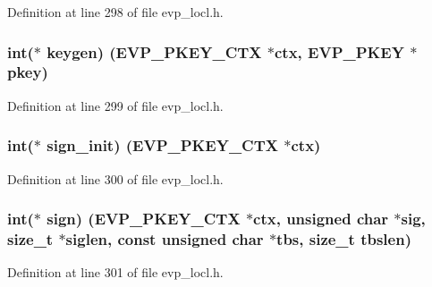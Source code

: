 Definition at line 298 of file evp\+\_\+locl.\+h.

\subsubsection[{\texorpdfstring{keygen}{keygen}}]{\setlength{\rightskip}{0pt plus 5cm}int($\ast$ keygen) ({\bf E\+V\+P\+\_\+\+P\+K\+E\+Y\+\_\+\+C\+TX} $\ast$ctx, {\bf E\+V\+P\+\_\+\+P\+K\+EY} $\ast$pkey)}\hypertarget{structevp__pkey__method__st_a4ce74ddc8b8f9d69e3e500756a7d2bc5}{}\label{structevp__pkey__method__st_a4ce74ddc8b8f9d69e3e500756a7d2bc5}


Definition at line 299 of file evp\+\_\+locl.\+h.

\subsubsection[{\texorpdfstring{sign\+\_\+init}{sign_init}}]{\setlength{\rightskip}{0pt plus 5cm}int($\ast$ sign\+\_\+init) ({\bf E\+V\+P\+\_\+\+P\+K\+E\+Y\+\_\+\+C\+TX} $\ast$ctx)}\hypertarget{structevp__pkey__method__st_ac2febe6e7261ac394df830c3c67bc5e7}{}\label{structevp__pkey__method__st_ac2febe6e7261ac394df830c3c67bc5e7}


Definition at line 300 of file evp\+\_\+locl.\+h.

\subsubsection[{\texorpdfstring{sign}{sign}}]{\setlength{\rightskip}{0pt plus 5cm}int($\ast$ sign) ({\bf E\+V\+P\+\_\+\+P\+K\+E\+Y\+\_\+\+C\+TX} $\ast$ctx, unsigned char $\ast$sig, size\+\_\+t $\ast$siglen, const unsigned char $\ast$tbs, size\+\_\+t tbslen)}\hypertarget{structevp__pkey__method__st_aa11ae74da52e528fef01fe4b57412842}{}\label{structevp__pkey__method__st_aa11ae74da52e528fef01fe4b57412842}


Definition at line 301 of file evp\+\_\+locl.\+h.

